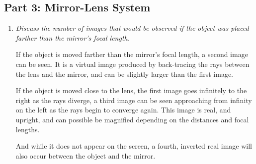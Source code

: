\documentclass[twocolumn,english]{IEEEtran}
\theoremstyle{plain}
\theoremstyle{plain}
\begin{document}
\subsection{Part 3: Mirror-Lens System}
\begin{enumerate}
	\item \textit{Discuss the number of images that would be observed if the object was placed farther than the mirror's focal length.}

	If the object is moved farther than the mirror's focal length, a second image can be seen. It is a virtual image produced by back-tracing the rays between the lens and the mirror, and can be slightly larger than the first image.

	If the object is moved close to the lens, the first image goes infinitely to the right as the rays diverge, a third image can be seen approaching from infinity on the left as the rays begin to converge again. This image is real, and upright, and can possible be magnified depending on the distances and focal lengths.

	And while it does not appear on the screen, a fourth, inverted real image will also occur between the object and the mirror.
\end{enumerate}


\appendices{}


%
%
\end{document}
